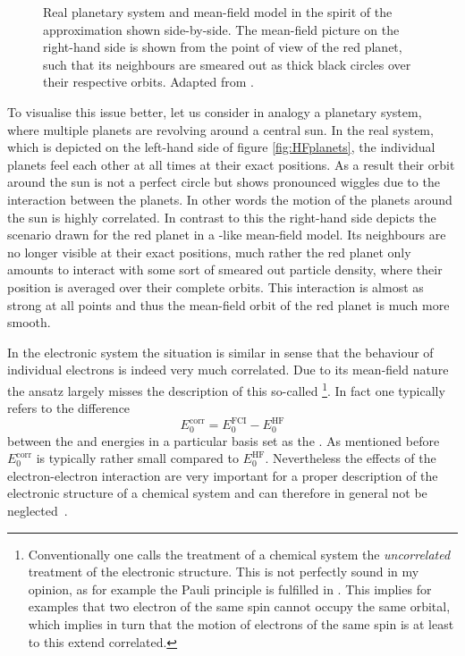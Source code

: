 \begin{figure}
	\centering
	\caption[Real planetary system and mean-field model of it shown side-by-side]{
		Real planetary system and mean-field model
		in the spirit of the \HF approximation
		shown side-by-side.
		The mean-field picture on the right-hand side
		is shown from the point of view of the red planet,
		such that its neighbours are smeared out as thick black
		circles over their respective orbits.
		Adapted from \cite{Jensen2007book}.
	}
	\label{fig:HFplanets}
\end{figure}
To visualise this issue better,
let us consider in analogy a planetary system,
where multiple planets are revolving around a central sun.
In the real system,
which is depicted on the left-hand side of figure \vref{fig:HFplanets},
the individual planets feel each other at all times
at their exact positions.
As a result their orbit around the sun is not a perfect circle but shows pronounced
wiggles due to the interaction between the planets.
In other words the motion of the planets around the sun is highly correlated.
In contrast to this the right-hand side
depicts the scenario drawn for the red planet in a \HF-like mean-field model.
Its neighbours are no longer visible at their exact positions,
much rather the red planet only amounts to interact with
some sort of smeared out particle density,
where their position is averaged over their complete orbits.
This interaction is almost as strong at all points
and thus the mean-field orbit of the red planet is much more smooth.

In the electronic system the situation is similar
in sense that the behaviour of individual electrons is indeed very much correlated.
Due to its mean-field nature the \HF ansatz
largely misses the description of this so-called %
\footnote{%
	Conventionally one calls the \HF treatment of a chemical system
	the \emph{uncorrelated} treatment of the electronic structure.
	This is not perfectly sound in my opinion,
	as for example the Pauli principle is fulfilled in \HF.
	This implies for examples that two electron of the same spin
	cannot occupy the same orbital,
	which implies in turn that the motion
	of electrons of the same spin is at least to this extend correlated.
}.
In fact one typically refers to the difference
\begin{equation}
	E_0^{\text{corr}} = E_0^{\text{FCI}} - E_0^{\text{HF}}
	\label{eqn:EnergyCorrelation}
\end{equation}
between the \HF and \FCI energies in a particular basis set
as the .
As mentioned before $E_0^{\text{corr}}$ is typically rather small
compared to $E_0^{\text{HF}}$.
Nevertheless the effects of the electron-electron interaction are very important
for a proper description of the electronic structure of a chemical
system and can therefore in general not be
neglected~\cite{Helgaker2013,Szabo1996,Jensen2007book}.


